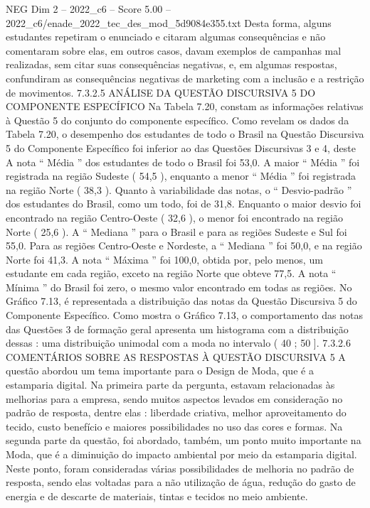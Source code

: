 \begin{textsample}{NEG Dim 2 – 2022\_c6 – Score 5.00 – 2022\_c6/enade\_2022\_tec\_des\_mod\_5d9084e355.txt}
Desta forma, alguns estudantes repetiram o enunciado e citaram algumas consequências e não comentaram sobre elas, em outros casos, davam exemplos de campanhas mal realizadas, sem citar suas consequências negativas, e, em algumas respostas, confundiram as consequências negativas de marketing com a inclusão e a restrição de movimentos. 7.3.2.5 ANÁLISE DA QUESTÃO DISCURSIVA 5 DO COMPONENTE ESPECÍFICO Na Tabela 7.20, constam as informações relativas à Questão 5 do conjunto do componente específico.
Como revelam os dados da Tabela 7.20, o desempenho dos estudantes de todo o Brasil na Questão Discursiva 5 do Componente Específico foi inferior ao das Questões Discursivas 3 e 4, deste A nota “ Média ” dos estudantes de todo o Brasil foi 53,0.
A maior “ Média ” foi registrada na região Sudeste ( 54,5 ), enquanto a menor “ Média ” foi registrada na região Norte ( 38,3 ).
Quanto à variabilidade das notas, o “ Desvio-padrão ” dos estudantes do Brasil, como um todo, foi de 31,8.
Enquanto o maior desvio foi encontrado na região Centro-Oeste ( 32,6 ), o menor foi encontrado na região Norte ( 25,6 ).
A “ Mediana ” para o Brasil e para as regiões Sudeste e Sul foi 55,0.
Para as regiões Centro-Oeste e Nordeste, a “ Mediana ” foi 50,0, e na região Norte foi 41,3.
A nota “ Máxima ” foi 100,0, obtida por, pelo menos, um estudante em cada região, exceto na região Norte que obteve 77,5.
A nota “ Mínima ” do Brasil foi zero, o mesmo valor encontrado em todas as regiões.
No Gráfico 7.13, é representada a distribuição das notas da Questão Discursiva 5 do Componente Específico.
Como mostra o Gráfico 7.13, o comportamento das notas das Questões 3 de formação geral apresenta um histograma com a distribuição dessas : uma distribuição unimodal com a moda no intervalo ( 40 ; 50 ]. 7.3.2.6 COMENTÁRIOS SOBRE AS RESPOSTAS À QUESTÃO DISCURSIVA 5 A questão abordou um tema importante para o Design de Moda, que é a estamparia digital.
Na primeira parte da pergunta, estavam relacionadas às melhorias para a empresa, sendo muitos aspectos levados em consideração no padrão de resposta, dentre elas : liberdade criativa, melhor aproveitamento do tecido, custo benefício e maiores possibilidades no uso das cores e formas.
Na segunda parte da questão, foi abordado, também, um ponto muito importante na Moda, que é a diminuição do impacto ambiental por meio da estamparia digital.
Neste ponto, foram consideradas várias possibilidades de melhoria no padrão de resposta, sendo elas voltadas para a não utilização de água, redução do gasto de energia e de descarte de materiais, tintas e tecidos no meio ambiente.

\end{textsample}
